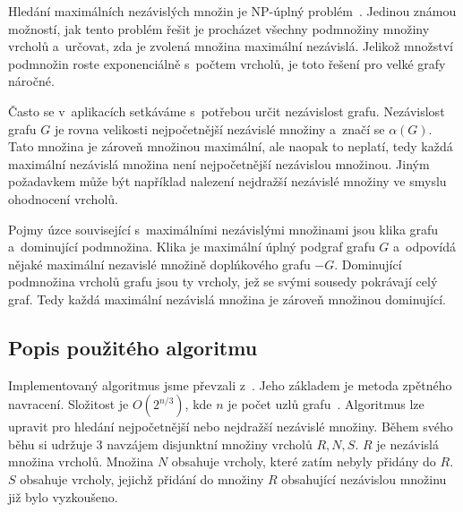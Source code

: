\documentclass[12pt]{article}
\begin{document}
Hledání maximálních nezávislých množin je NP-úplný problém~\cite{tarjan}. Jedinou známou možností, jak tento problém řešit je procházet všechny podmnožiny množiny vrcholů a~určovat, zda je zvolená množina maximální nezávislá. Jelikož množství podmnožin roste exponenciálně s~počtem vrcholů, je toto řešení pro velké grafy náročné.

Často se v~aplikacích  setkáváme s~potřebou určit nezávislost grafu. Nezávislost grafu \(G\) je rovna velikosti nejpočetnější nezávislé množiny a~značí se \(\alpha(G)\). Tato množina je zároveň množinou maximální, ale naopak to neplatí, tedy každá maximální nezávislá množina není nejpočetnější nezávislou množinou. Jiným požadavkem může být například nalezení nejdražší nezávislé množiny ve smyslu ohodnocení vrcholů.

Pojmy úzce související s~maximálními nezávislými množinami jsou klika grafu a~dominující podmnožina. Klika je maximální úplný podgraf grafu \(G\) a~odpovídá nějaké maximální nezavislé množině doplńkového grafu \(-G\). Dominující podmnožina vrcholů grafu jsou ty vrcholy, jež se svými sousedy pokrávají celý graf. Tedy každá maximální nezávislá množina je zároveň množinou dominující.

\subsection{Popis použitého algoritmu}
Implementovaný algoritmus jsme převzali z~\cite{demel}. Jeho základem je metoda zpětného navracení. Složitost je \(O(2^{n/3})\), kde \(n\) je počet uzlů grafu~\cite{tarjan}. Algoritmus lze upravit pro hledání nejpočetnější nebo nejdražší nezávislé množiny. Během svého běhu si udržuje 3 navzájem disjunktní množiny vrcholů \(R, N, S\). \(R\) je nezávislá množina vrcholů. Množina \(N\) obsahuje vrcholy, které zatím nebyly přidány do \(R\). \(S\) obsahuje vrcholy, jejichž přidání do množiny $R$ obsahující nezávislou množinu již bylo vyzkoušeno.
\end{document}
